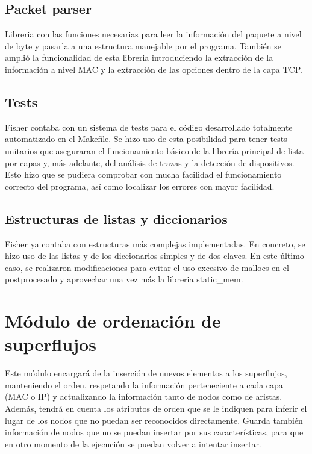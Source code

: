 \documentclass[twoside, 12pt]{epstfg}
\begin{document}
\subsection{Packet parser}
Libreria con las funciones necesarias para leer la información del paquete a nivel de byte y pasarla a una estructura manejable por el programa. También se amplió la funcionalidad de esta libreria introduciendo la extracción de la información a nivel MAC y la extracción de las opciones dentro de la capa TCP.
\subsection{Tests}
Fisher contaba con un sistema de tests para el código desarrollado totalmente automatizado en el Makefile. Se hizo uso de esta posibilidad para tener tests unitarios que aseguraran el funcionamiento básico de la librería principal de lista por capas y, más adelante, del análisis de trazas y la detección de dispositivos. Esto hizo que se pudiera comprobar con mucha facilidad el funcionamiento correcto del programa, así como localizar los errores con mayor facilidad.

\subsection{Estructuras de listas y diccionarios}
Fisher ya contaba con estructuras más complejas implementadas. En concreto, se hizo uso de las listas y de los diccionarios simples y de dos claves. En este último caso, se realizaron modificaciones para evitar el uso excesivo de mallocs en el postprocesado y aprovechar una vez más la libreria static\_mem.

\section{Módulo de ordenación de superflujos}

Este módulo encargará de la inserción de nuevos elementos a los superflujos, manteniendo el orden, respetando la información perteneciente a cada capa (MAC o IP) y actualizando la información tanto de nodos como de aristas. Además, tendrá en cuenta los atributos de orden que se le indiquen para inferir el lugar de los nodos que no puedan ser reconocidos directamente. Guarda también información de nodos que no se puedan insertar por sus características, para que en otro momento de la ejecución se puedan volver a intentar insertar.
\end{document}
